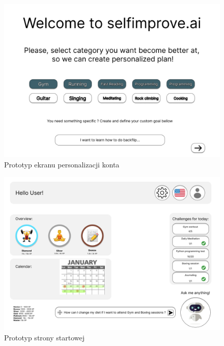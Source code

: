 \begin{figure}[h]
    \centering
    \includegraphics[width=1\textwidth]{Obrazy/prototypy/personalizacja_konta.png}
    \caption{Prototyp ekranu personalizacji konta}
    \label{fig:my_label}
\end{figure}

\begin{figure}[h]
    \centering
    \includegraphics[width=1\textwidth]{Obrazy/prototypy/strona_startowa.png}
    \caption{Prototyp strony startowej}
    \label{fig:my_label}
\end{figure}

